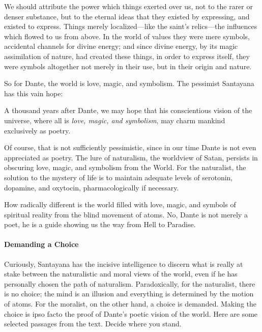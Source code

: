 \begin{quotex}
We should attribute the power which things exerted over us, not to the rarer or denser substance, but to the eternal ideas that they existed by expressing, and existed to express. Things merely localized—like the saint's relics—the influences which flowed to us from above. In the world of values they were mere symbols, accidental channels for divine energy; and since divine energy, by its magic assimilation of nature, had created these things, in order to express itself, they were symbols altogether not merely in their use, but in their origin and nature. 

\end{quotex}
So for Dante, the world is love, magic, and symbolism. The pessimist Santayana has this vain hope:

\begin{quotex}
A thousand years after Dante, we may hope that his conscientious vision of the universe, where all is \emph{love, magic, and symbolism}, may charm mankind exclusively as poetry. 

\end{quotex}
Of course, that is not sufficiently pessimistic, since in our time Dante is not even appreciated as poetry. The lure of naturalism, the worldview of Satan, persists in obscuring love, magic, and symbolism from the World. For the naturalist, the solution to the mystery of life is to maintain adequate levels of serotonin, dopamine, and oxytocin, pharmacologically if necessary.

How radically different is the world filled with love, magic, and symbols of spiritual reality from the blind movement of atoms. No, Dante is not merely a poet, he is a guide showing us the way from Hell to Paradise.

\paragraph{Demanding a Choice}
Curiously, Santayana has the incisive intelligence to discern what is really at stake between the naturalistic and moral views of the world, even if he has personally chosen the path of naturalism. Paradoxically, for the naturalist, there is no choice; the mind is an illusion and everything is determined by the motion of atoms. For the moralist, on the other hand, a choice is demanded. Making the choice is ipso facto the proof of Dante's poetic vision of the world. Here are some selected passages from the text. Decide where you stand.

